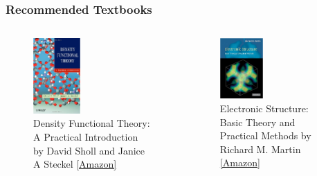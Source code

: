 \documentclass[aspectratio=169]{beamer}
\begin{document}
\begin{frame}
\frametitle{Recommended Textbooks}

\begin{columns}
\begin{figure}
    \centering
    \includegraphics[width=0.4\textwidth]{lectures/figures/0_DFT_a_practical_introduction.png}
    \caption{Density Functional Theory: A Practical Introduction by David Sholl and Janice A Steckel 
    \href{https://www.amazon.com/Density-Functional-Theory-Practical-Introduction-ebook/dp/B005PS4Z3A}{[Amazon]}}
\end{figure}
\begin{figure}
    \centering
    \includegraphics[width=0.4\textwidth]{lectures/figures/0_martin_electronic_structure.png}
    \caption{Electronic Structure: Basic Theory and Practical Methods by Richard M. Martin 
        \href{https://www.amazon.com/Electronic-Structure-Theory-Practical-Methods/dp/0521534402 }{[Amazon]}}
\end{figure}
\end{columns}
\end{frame}
\end{document}
